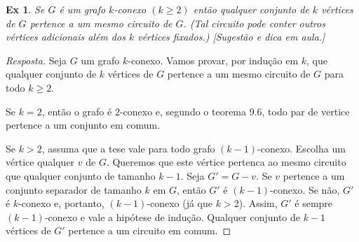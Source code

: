 \documentclass[12pt]{article}
\newcounter{exCounter}
\newtheorem{ex}[exCounter]{Ex}
\begin{document}
\begin{ex}
Se $G$ é um grafo $k$-conexo $(k \geq 2)$ então qualquer conjunto de $k$ vértices de $G$ pertence a um mesmo circuito de $G$. (Tal circuito pode conter outros vértices adicionais além dos $k$ vértices fixados.) [Sugestão e dica em aula.]
\end{ex}

\begin{proof}[Resposta]
Seja $G$ um grafo $k$-conexo. Vamos provar, por indução em $k$, que qualquer conjunto de $k$ vértices de $G$ pertence a um mesmo circuito de $G$ para todo $k \geq 2$.

Se $k = 2$, então o grafo é $2$-conexo e, segundo o teorema 9.6, todo par de vertice pertence a um conjunto em comum.

Se $k > 2$, assuma que a tese vale para todo grafo $(k-1)$-conexo. Escolha um vértice qualquer $v$ de $G$. Queremos que este vértice pertenca ao mesmo circuito que qualquer conjunto de tamanho $k-1$. Seja $G' = G-v$. Se $v$ pertence a um conjunto separador de tamanho $k$ em $G$, então $G'$ é $(k-1)$-conexo. Se não, $G'$ é $k$-conexo e, portanto, $(k-1)$-conexo (já que $k > 2$). Assim, $G'$ é sempre $(k-1)$-conexo e vale a hipótese de indução. Qualquer conjunto de $k-1$ vértices de $G'$ pertence a um circuito em comum.
\end{proof}
\end{document}

